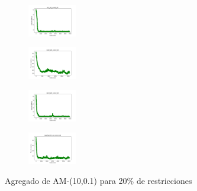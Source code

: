 \begin{figure}[H]
\begin{subfigure}
    \end{subfigure}
    \hfill
    \begin{subfigure}
        \centering
        \includegraphics[width=0.234\textwidth]{img/am01/iris_set_const_20_3773969821_cost.png}
    \end{subfigure}
    \hfill
    \begin{subfigure}
        \centering
        \includegraphics[width=0.234\textwidth]{img/am01/ecoli_set_const_20_3773969821_cost.png}
    \end{subfigure}
    \hfill
    \begin{subfigure}
        \centering
        \includegraphics[width=0.234\textwidth]{img/am01/rand_set_const_20_3773969821_cost.png}
    \end{subfigure}
    \hfill
    \begin{subfigure}
        \centering
        \includegraphics[width=0.234\textwidth]{img/am01/newthyroid_set_const_20_3773969821_cost.png}
    \end{subfigure}
    \caption{Agregado de AM-(10,0.1) para 20\% de restricciones}
\end{figure}

\vspace*{\fill}
\newpage


